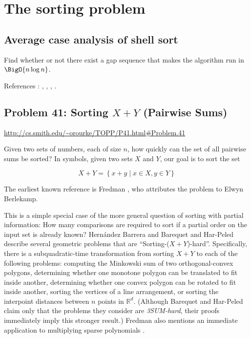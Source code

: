 \section{The sorting problem}


\subsection{Average case analysis of shell sort}


Find whether or not there exist a gap sequence that makes the algorithm run in $\BigO{n \log n}$.


References : \cite{ciura2001best}, \cite{jiang2000lower}, \cite{sedgewick1996analysis}, \cite{knuth1998art}.



\subsection{Problem 41: Sorting $X + Y$ (Pairwise Sums)}

\url{http://cs.smith.edu/~orourke/TOPP/P41.html#Problem.41}


Given two sets of numbers, each of size $n$, how quickly can the set of all pairwise sums be sorted? In symbols, given two sets $X$ and $Y$, our goal is to sort the set

$$ X + Y = \left\{{x + y \mid x \in X, y \in Y }\right\} $$

The earliest known reference is Fredman \cite{fredman1976good}, who attributes the problem to Elwyn Berlekamp.

This is a simple special case of the more general question of sorting with partial information: How many comparisons are required to sort if a partial order on the input set is already known? Hernández Barrera \cite{barrera1996finding} and Barequet and Har-Peled \cite{barequet2001polygon} describe several geometric problems that are ``Sorting-($X + Y$)-hard''. Specifically, there is a subquadratic-time transformation from sorting $X + Y$ to each of the following problems: computing the Minkowski sum of two orthogonal-convex polygons, determining whether one monotone polygon can be translated to fit inside another, determining whether one convex polygon can be rotated to fit inside another, sorting the vertices of a line arrangement, or sorting the interpoint distances between $n$ points in $\mathbb{R}^d$. (Although Barequet and Har-Peled \cite{barequet2001polygon} claim only that the problems they consider are \emph{3SUM-hard}, their proofs immediately imply this stronger result.) Fredman also mentions an immediate application to multiplying sparse polynomials \cite{fredman1976good}.

